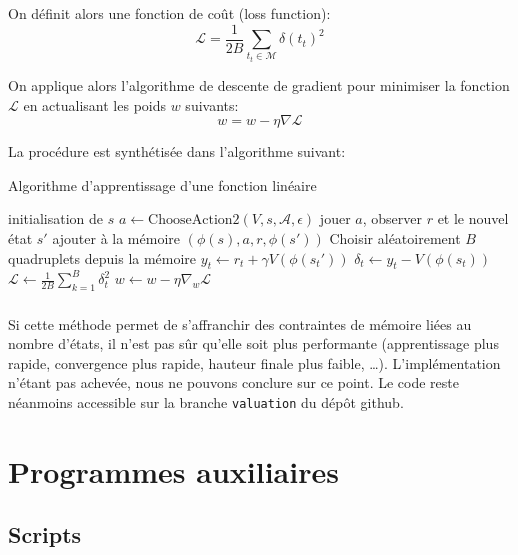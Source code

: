 \documentclass{report}
\begin{document}
On définit alors une fonction de coût (loss function):
\[
\mathcal{L} = \frac{1}{2B} \sum _{t_t \in \mathcal{M}} \delta(t_t)^2
\]

On applique alors l'algorithme de descente de gradient pour minimiser la fonction
\( \mathcal{L} \) en actualisant les poids \( w \) suivants:
\[
w = w - \eta \nabla \mathcal{L}
\]

La procédure est synthétisée dans l'algorithme suivant:

\begin{algorithm}[H]
  \caption{Algorithme d'apprentissage d'une fonction linéaire}\label{alg:linfct}
  \begin{algorithmic}
    [1]
    \Repeat{}
    \State{} initialisation de \(s\)
    \Repeat{}
    \State{} \(a \gets \mathup{ChooseAction2}(V, s, \mathcal{A}, \epsilon)\)
    \State{} jouer \(a\), observer \(r\) et le nouvel \'etat \(s'\)
    \State{} ajouter à la mémoire \( \left(\phi(s), a, r, \phi(s')\right) \)
    \EndFor{}
    \State{} Choisir aléatoirement \(B\) quadruplets depuis la mémoire
    \State{} \(y_t \gets r_t + \gamma V\left(\phi(s_t')\right)\)
    \State{} \(\delta_t \gets y_t - V \left(\phi(s_t)\right)\)
    \State{} \(\mathcal{L} \gets \frac{1}{2B}\sum_{k=1}^B \delta_t^2\)
    \State{} \(w \gets w - \eta \nabla_w \mathcal{L}\)
    \EndProcedure{}
  \end{algorithmic}
\end{algorithm}


\paragraph{}
Si cette méthode permet de s'affranchir des contraintes de mémoire liées au
nombre d'états, il n'est pas sûr qu'elle soit plus performante (apprentissage
plus rapide, convergence plus rapide, hauteur finale plus faible, \dots).
L'implémentation n'étant pas achevée, nous ne pouvons conclure sur ce point. Le
code reste néanmoins accessible sur la branche \texttt{valuation} du dépôt
github.






\chapter{Programmes auxiliaires}
\section{Scripts}\label{sec:faisceaux}
\end{document}
